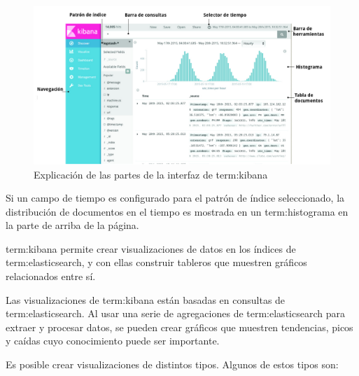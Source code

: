 \begin{figure}
  \includegraphics[width=\linewidth]{src/images/05-capitulo-5/kibana-ux.png}
  \caption{Explicación de las partes de la interfaz de \gls{term:kibana}}
  \label{fig:kibana-ux}
\end{figure}


Si un campo de tiempo es configurado para el patrón de índice seleccionado, la
distribución de documentos en el tiempo es mostrada en un \gls{term:histograma}
en la parte de arriba de la página.

\gls{term:kibana} permite crear visualizaciones de datos en los índices de
\gls{term:elasticsearch}, y con ellas construir tableros que muestren
gráficos relacionados entre sí.

Las visualizaciones de \gls{term:kibana} están basadas en consultas de
\gls{term:elasticsearch}. Al usar una serie de agregaciones de
\gls{term:elasticsearch} para extraer y procesar datos, se pueden crear
gráficos que muestren tendencias, picos y caídas cuyo conocimiento puede ser
importante.

Es posible crear visualizaciones de distintos tipos. Algunos de estos tipos son:


